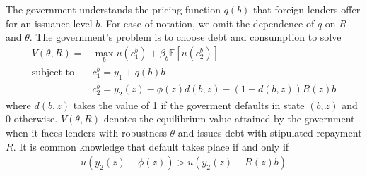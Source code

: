 
The government understands the pricing function $q(b)$ that foreign lenders offer for an issuance level $b$. For ease of notation, we omit the dependence of $q$ on $R$ and $\theta$. The government's problem is to choose debt and consumption to solve
\begin{align*}
	V(\theta, R) = &\max_b u(c_1^b) + \beta_b \mathbb{E}\left[u(c_2^b) \right] \\
	\text{subject to }\;
	& c_1^b = y_1 + q(b) b \\
	& c_2^b = y_2(z) - \phi(z)d(b,z) - (1-d(b,z)) R(z) b
\end{align*}
where $d(b,z)$ takes the value of 1 if the goverment defaults in state $(b,z)$ and 0 otherwise. $V(\theta, R)$ denotes the equilibrium value attained by the government when it faces lenders with robustness $\theta$ and issues debt with stipulated repayment $R$. It is common knowledge that default takes place if and only if
\begin{align*}
	u\left(y_2(z) - \phi(z)\right) > u\left(y_2(z) - R(z) b\right)
\end{align*}

